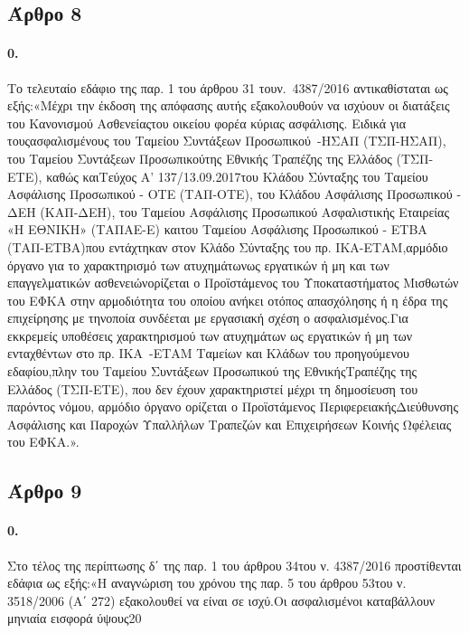 \documentclass[a4paper,oneside, 10pt]{book}
\begin{document}
\subsection*{ Άρθρο 8 }
\paragraph { 0. } Το τελευταίο εδάφιο της παρ. 1 του άρθρου 31 τουν. 4387/2016 αντικαθίσταται ως εξής:«Μέχρι την έκδοση της απόφασης αυτής εξακολουθούν να ισχύουν οι διατάξεις του Κανονισμού Ασθενείαςτου οικείου φορέα κύριας ασφάλισης. Ειδικά για τουςασφαλισμένους του Ταμείου Συντάξεων Προσωπικού -ΗΣΑΠ (ΤΣΠ-ΗΣΑΠ), του Ταμείου Συντάξεων Προσωπικούτης Εθνικής Τραπέζης της Ελλάδος (ΤΣΠ-ΕΤΕ), καθώς καιΤεύχος Α’ 137/13.09.2017του Κλάδου Σύνταξης του Ταμείου Ασφάλισης Προσωπικού - ΟΤΕ (ΤΑΠ-ΟΤΕ), του Κλάδου Ασφάλισης Προσωπικού - ΔΕΗ (ΚΑΠ-ΔΕΗ), του Ταμείου Ασφάλισης Προσωπικού Ασφαλιστικής Εταιρείας «Η ΕΘΝΙΚΗ» (ΤΑΠΑΕ-Ε) καιτου Ταμείου Ασφάλισης Προσωπικού - ΕΤΒΑ (ΤΑΠ-ΕΤΒΑ)που εντάχτηκαν στον Κλάδο Σύνταξης του πρ. ΙΚΑ-ΕΤΑΜ,αρμόδιο όργανο για το χαρακτηρισμό των ατυχημάτωνως εργατικών ή μη και των επαγγελματικών ασθενειώνορίζεται ο Προϊστάμενος του Υποκαταστήματος Μισθωτών του ΕΦΚΑ στην αρμοδιότητα του οποίου ανήκει οτόπος απασχόλησης ή η έδρα της επιχείρησης με τηνοποία συνδέεται με εργασιακή σχέση ο ασφαλισμένος.Για εκκρεμείς υποθέσεις χαρακτηρισμού των ατυχημάτων ως εργατικών ή μη των ενταχθέντων στο πρ. ΙΚΑ -ΕΤΑΜ Ταμείων και Κλάδων του προηγούμενου εδαφίου,πλην του Ταμείου Συντάξεων Προσωπικού της ΕθνικήςΤραπέζης της Ελλάδος (ΤΣΠ-ΕΤΕ), που δεν έχουν χαρακτηριστεί μέχρι τη δημοσίευση του παρόντος νόμου, αρμόδιο όργανο ορίζεται ο Προϊστάμενος ΠεριφερειακήςΔιεύθυνσης Ασφάλισης και Παροχών Υπαλλήλων Τραπεζών και Επιχειρήσεων Κοινής Ωφέλειας του ΕΦΚΑ.».
\subsection*{ Άρθρο 9 }
\paragraph { 0. } Στο τέλος της περίπτωσης δ΄ της παρ. 1 του άρθρου 34του ν. 4387/2016 προστίθενται εδάφια ως εξής:«Η αναγνώριση του χρόνου της παρ. 5 του άρθρου 53του ν. 3518/2006 (Α΄ 272) εξακολουθεί να είναι σε ισχύ.Οι ασφαλισμένοι καταβάλλουν μηνιαία εισφορά ύψους20%
\end{document}
